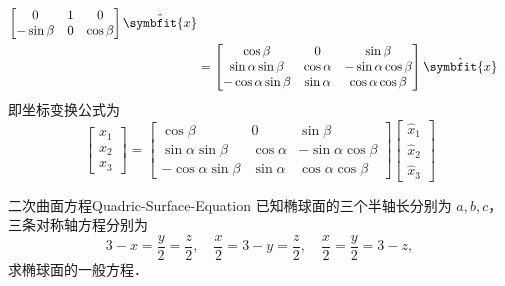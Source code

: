 \begin{solution}
\begin{equation}
\begin{aligned}
\begin{bmatrix}
                                              0          & 1 & 0         \\
                                              -\sin\beta & 0 & \cos\beta
                                          \end{bmatrix} \hat{\symbfit{x}}                \\
                        & = \begin{bmatrix}
                                \cos\beta            & 0          & \sin\beta            \\
                                \sin\alpha\sin\beta  & \cos\alpha & -\sin\alpha\cos\beta \\
                                -\cos\alpha\sin\beta & \sin\alpha & \cos\alpha\cos\beta
                            \end{bmatrix} \hat{\symbfit{x}}
        \end{aligned}
    \end{equation}
    即坐标变换公式为
    \begin{equation}
        \boxed{\begin{bmatrix} x_1 \\ x_2 \\ x_3 \end{bmatrix} = \begin{bmatrix} \cos\beta & 0 & \sin\beta \\ \sin\alpha\sin\beta & \cos\alpha & -\sin\alpha\cos\beta \\ -\cos\alpha\sin\beta & \sin\alpha & \cos\alpha\cos\beta \end{bmatrix} \begin{bmatrix} \hat{x}_1 \\ \hat{x}_2 \\ \hat{x}_3 \end{bmatrix}}
    \end{equation}
\end{solution}


\begin{problem}{二次曲面方程}{Quadric-Surface-Equation}
    已知椭球面的三个半轴长分别为 $a,b,c$，三条对称轴方程分别为
    \begin{equation}
        3 - x = \frac{y}{2} = \frac{z}{2}, \quad \frac{x}{2} = 3 - y = \frac{z}{2}, \quad \frac{x}{2} = \frac{y}{2} = 3 - z,
    \end{equation}
    求椭球面的一般方程．
\end{problem}

